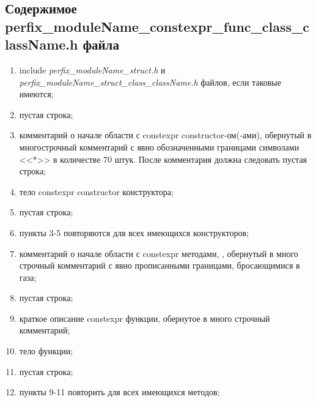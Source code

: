 \subsection{Содержимое perfix\-\_moduleName\-\_constexpr\-\_func\-\_class\-\_class\-Name.h файла}\label{p:conf:ch}
\begin{enumerate}
	\item include \textit{perfix\_moduleName\_struct.h} и \textit{perfix\_moduleName\_struct\_class\_className.h} файлов, если таковые имеются;
	\item пустая строка;
	\item комментарий о начале области с constexpr constructor-ом(-ами), обернутый в многострочный комментарий с явно обозначенными границами символами <<*>> в количестве 70 штук. После комментария должна следовать  пустая строка;
	\item тело constexpr constructor конструктора;
	\item пустая строка;
	\item пункты 3-5 повторяются для всех имеющихся конструкторов;
	\item комментарий о начале области с constexpr методами, , обернутый в много строчный комментарий с явно прописанными границами, бросающимися в газа;
	\item пустая строка;
	\item краткое описание constexpr функции, обернутое в много строчный комментарий;
	\item тело функции;
	\item пустая строка;
	\item пункты 9-11 повторить для всех имеющихся методов;
	
\end{enumerate}
